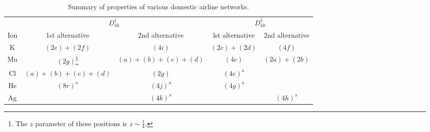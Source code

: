 \documentclass[twocolumn,showpacs,preprintnumbers,amsmath,amssymb]{revtex4}
\begin{document}
%
\begin{table*}
\caption{\label{tab:table1}Summary of properties of various domestic airline networks.}
\begin{ruledtabular}
\begin{tabular}{ccccc}
 &\multicolumn{2}{c}{$D_{4h}^1$}&\multicolumn{2}{c}{$D_{4h}^5$}\\
 Ion&1st alternative&2nd alternative&lst alternative
&2nd alternative\\ \hline
 K&$(2e)+(2f)$&$(4i)$ &$(2c)+(2d)$&$(4f)$ \\
 Mn&$(2g)$\footnote{The $z$ parameter of these positions is $z\sim\frac{1}{4}$.}
 &$(a)+(b)+(c)+(d)$&$(4e)$&$(2a)+(2b)$\\
 Cl&$(a)+(b)+(c)+(d)$&$(2g)$\footnotemark[1]
 &$(4e)^{\text{a}}$\\
 He&$(8r)^{\text{a}}$&$(4j)^{\text{a}}$&$(4g)^{\text{a}}$\\
 Ag& &$(4k)^{\text{a}}$& &$(4h)^{\text{a}}$\\
\end{tabular}
\end{ruledtabular}
\end{table*}
%
%
%
\end{document}

